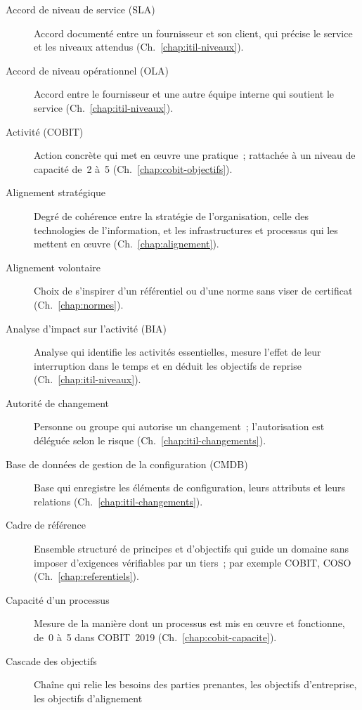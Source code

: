 \begin{description}
    \item[Accord de niveau de service (SLA)] Accord documenté entre un
          fournisseur et son client, qui précise le service et les niveaux
          attendus (Ch.~\ref{chap:itil-niveaux}).
    \item[Accord de niveau opérationnel (OLA)] Accord entre le fournisseur et
          une autre équipe interne qui soutient le service
          (Ch.~\ref{chap:itil-niveaux}).
    \item[Activité (COBIT)] Action concrète qui met en œuvre une pratique~;
          rattachée à un niveau de capacité de~2 à~5
          (Ch.~\ref{chap:cobit-objectifs}).
    \item[Alignement stratégique] Degré de cohérence entre la stratégie de
          l'organisation, celle des technologies de l'information, et les
          infrastructures et processus qui les mettent en œuvre
          (Ch.~\ref{chap:alignement}).
    \item[Alignement volontaire] Choix de s'inspirer d'un référentiel ou
          d'une norme sans viser de certificat (Ch.~\ref{chap:normes}).
    \item[Analyse d'impact sur l'activité (BIA)] Analyse qui identifie les
          activités essentielles, mesure l'effet de leur interruption dans
          le temps et en déduit les objectifs de reprise
          (Ch.~\ref{chap:itil-niveaux}).
    \item[Autorité de changement] Personne ou groupe qui autorise un
          changement~; l'autorisation est déléguée selon le risque
          (Ch.~\ref{chap:itil-changements}).
    \item[Base de données de gestion de la configuration (CMDB)] Base qui
          enregistre les éléments de configuration, leurs attributs et
          leurs relations (Ch.~\ref{chap:itil-changements}).
    \item[Cadre de référence] Ensemble structuré de principes et
          d'objectifs qui guide un domaine sans imposer d'exigences
          vérifiables par un tiers~; par exemple COBIT, COSO
          (Ch.~\ref{chap:referentiels}).
    \item[Capacité d'un processus] Mesure de la manière dont un processus
          est mis en œuvre et fonctionne, de~0 à~5 dans COBIT~2019
          (Ch.~\ref{chap:cobit-capacite}).
    \item[Cascade des objectifs] Chaîne qui relie les besoins des parties
          prenantes, les objectifs d'entreprise, les objectifs d'alignement

\end{description}
